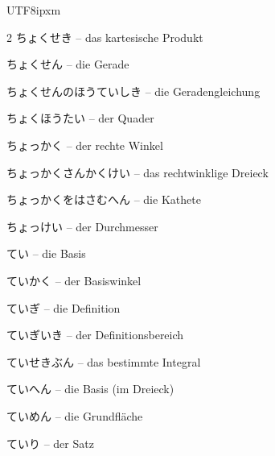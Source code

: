 \begin{CJK}{UTF8}{ipxm}
\begin{multicols}{2}
 {\footnotesize\color{black!70}ちょくせき} -- das kartesische Produkt\dotfill\hyperref[e:103]{\pageref*{e:103}}\par
{} {\footnotesize\color{black!70}ちょくせん} -- die Gerade\dotfill\hyperref[e:147]{\pageref*{e:147}}\par
{} {\footnotesize\color{black!70}ちょくせんのほうていしき} -- die Geradengleichung\dotfill\hyperref[e:309]{\pageref*{e:309}}\par
{} {\footnotesize\color{black!70}ちょくほうたい} -- der Quader\dotfill\hyperref[e:227]{\pageref*{e:227}}\par
{} {\footnotesize\color{black!70}ちょっかく} -- der rechte Winkel\dotfill\hyperref[e:158]{\pageref*{e:158}}\par
{} {\footnotesize\color{black!70}ちょっかくさんかくけい} -- das rechtwinklige Dreieck\dotfill\hyperref[e:181]{\pageref*{e:181}}\par
{} {\footnotesize\color{black!70}ちょっかくをはさむへん} -- die Kathete\dotfill\hyperref[e:187]{\pageref*{e:187}}\par
{} {\footnotesize\color{black!70}ちょっけい} -- der Durchmesser\dotfill\hyperref[e:214]{\pageref*{e:214}}\par
{} {\footnotesize\color{black!70}てい} -- die Basis\dotfill\hyperref[e:43]{\pageref*{e:43}}\par
{} {\footnotesize\color{black!70}ていかく} -- der Basiswinkel\dotfill\hyperref[e:184]{\pageref*{e:184}}\par
{} {\footnotesize\color{black!70}ていぎ} -- die Definition\dotfill\hyperref[e:346]{\pageref*{e:346}}\par
{} {\footnotesize\color{black!70}ていぎいき} -- der Definitionsbereich\dotfill\hyperref[e:109]{\pageref*{e:109}}\par
{} {\footnotesize\color{black!70}ていせきぶん} -- das bestimmte Integral\dotfill\hyperref[e:288]{\pageref*{e:288}}\par
{} {\footnotesize\color{black!70}ていへん} -- die Basis (im Dreieck)\dotfill\hyperref[e:183]{\pageref*{e:183}}\par
{} {\footnotesize\color{black!70}ていめん} -- die Grundfläche\dotfill\hyperref[e:248]{\pageref*{e:248}}\par
{} {\footnotesize\color{black!70}ていり} -- der Satz\dotfill\hyperref[e:347]{\pageref*{e:347}}\par

\end{multicols}
\end{CJK}
